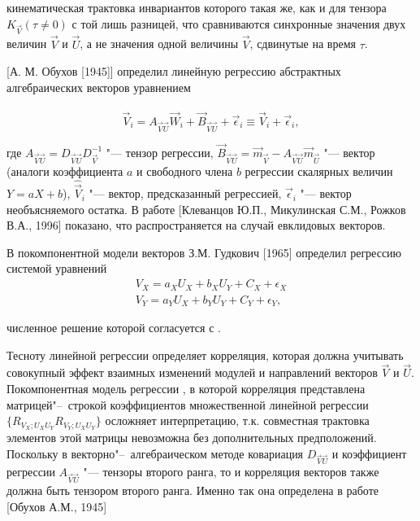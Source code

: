 кинематическая трактовка инвариантов которого такая же, как и для тензора $K_{\vec{V}}(\tau\ne0)$ с той лишь разницей, что сравниваются синхронные значения двух величин $\vec{V}$ и $\vec{U}$, а не значения одной величины $\vec{V}$, сдвинутые на время $\tau$.
            
[А. М. Обухов [1945]] определил линейную регрессию абстрактных алгебраических векторов уравнением

\begin{equation}
\label{eq:equation3_21}
{\vec{V}_{i}=A_{\vec{V}\vec{U}}\vec{W}_{i}+\vec{B}_{\vec{V}\vec{U}}+\vec{\epsilon}_{i}\equiv\hat{\vec{V}}_{i}+\vec{\epsilon}_{i}},
\end{equation} 

где $A_{\vec{V}\vec{U}}=D_{\vec{V}\vec{U}}D^{-1}_{\vec{V}}$ "--- тензор регрессии, $\vec{B}_{\vec{V}\vec{U}}=\vec{m}_{\vec{V}}-A_{\vec{V}\vec{U}}\vec{m}_{\vec{U}}$ "--- вектор (аналоги коэффициента $a$ и свободного члена $b$ регрессии скалярных величин $Y=aX+b$), $\hat{\vec{V}}_{i}$ "--- вектор, предсказанный регрессией, $\vec{\epsilon}_{i}$ "--- вектор необъясняемого остатка. В работе [Клеванцов Ю.П., Микулинская С.М., Рожков В.А., 1996] показано, что  распространяется на случай евклидовых векторов.
 
В покомпонентной модели векторов З.М. Гудкович [1965] определил регрессию системой уравнений
\begin{eqnarray}
\label{eq:equation3_22}
{V_{X}=a_{X}U_{X}+b_{X}U_{Y}+C_{X}+\epsilon_{X}}\\
{V_{Y}=a_{Y}U_{X}+b_{Y}U_{Y}+C_{Y}+\epsilon_{Y}},\nonumber
\end{eqnarray}


численное решение которой согласуется с .

Тесноту линейной регрессии  определяет корреляция, которая должна учитывать совокупный эффект взаимных изменений модулей и направлений векторов $\vec{V}$ и $\vec{U}$. Покомпонентная модель регрессии , в которой корреляция представлена матрицей"--~строкой коэффициентов множественной линейной регрессии $\{R_{V_{X};U_{X}U_{Y}}  R_{V_{Y};U_{X}U_{Y}}\}$ осложняет интерпретацию, т.к. совместная трактовка элементов этой матрицы невозможна без дополнительных предположений. Поскольку в векторно"--~алгебраическом методе ковариация $D_{\vec{V}\vec{U}}$  и коэффициент регрессии $A_{\vec{V}\vec{U}}$  "--- тензоры второго ранга, то и корреляция векторов также должна быть тензором второго ранга. Именно так она определена в работе [Обухов А.М., 1945]  

